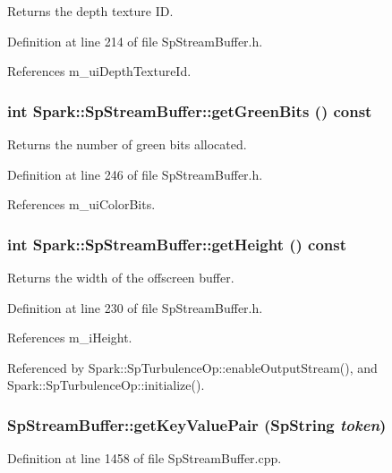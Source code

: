 Returns the depth texture ID. 

Definition at line 214 of file Sp\-Stream\-Buffer.h.

References m\_\-ui\-Depth\-Texture\-Id.
\subsubsection{\setlength{\rightskip}{0pt plus 5cm}int Spark::Sp\-Stream\-Buffer::get\-Green\-Bits () const\hspace{0.3cm}{\tt  [inline]}}\label{classSpark_1_1SpStreamBuffer_a24}


Returns the number of green bits allocated. 

Definition at line 246 of file Sp\-Stream\-Buffer.h.

References m\_\-ui\-Color\-Bits.
\subsubsection{\setlength{\rightskip}{0pt plus 5cm}int Spark::Sp\-Stream\-Buffer::get\-Height () const\hspace{0.3cm}{\tt  [inline]}}\label{classSpark_1_1SpStreamBuffer_a20}


Returns the width of the offscreen buffer. 

Definition at line 230 of file Sp\-Stream\-Buffer.h.

References m\_\-i\-Height.

Referenced by Spark::Sp\-Turbulence\-Op::enable\-Output\-Stream(), and Spark::Sp\-Turbulence\-Op::initialize().
\subsubsection{ Sp\-Stream\-Buffer::get\-Key\-Value\-Pair ({\bf Sp\-String} {\em token})\hspace{0.3cm}{\tt  [protected]}}\label{classSpark_1_1SpStreamBuffer_b3}


Definition at line 1458 of file Sp\-Stream\-Buffer.cpp.


